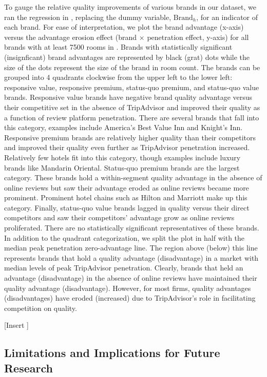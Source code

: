 \documentclass[mksc,blindrev]{informs3} %
\begin{document}
To gauge the relative quality improvements of various brands in our dataset, we ran the regression in , replacing the dummy variable, $\text{Brand}_h$, for an indicator of each brand. For ease of interpretation, we plot the brand advantage (x-axis) versus the advantage erosion effect (brand $\times$ penetration effect, y-axis) for all brands with at least 7500 rooms in . Brands with statistically significant (insignficant) brand advantages are represented by black (grat) dots while the size of the dots represent the size of the brand in room count. The brands can be grouped into 4 quadrants clockwise from the upper left to the lower left: responsive value, responsive premium, status-quo premium, and status-quo value brands. Responsive value brands have negative brand quality advantage versus their competitive set in the absence of TripAdvisor and improved their quality as a function of review platform penetration. There are several brands that fall into this category, examples include America's Best Value Inn and Knight's Inn. Responsive premium brands are relatively higher quality than their competitors and improved their quality even further as TripAdvisor penetration increased. Relatively few hotels fit into this category, though examples include luxury brands like Mandarin Oriental. Status-quo premium brands are the largest category. These brands hold a within-segment quality advantage in the absence of online reviews but saw their advantage eroded as online reviews became more prominent. Prominent hotel chains such as Hilton and Marriott make up this category. Finally, status-quo value brands lagged in quality versus their direct competitors and saw their competitors' advantage grow as online reviews proliferated. There are no statistically significant representatives of these brands. In addition to the quadrant categorization, we split the plot in half with the median peak penetration zero-advantage line. The region above (below) this line represents brands that hold a quality advantage (disadvantage) in a market with median levels of peak TripAdvisor penetration. Clearly, brands that held an advantage (disadvantage) in the absence of online reviews have maintained their quality advantage (disadvantage). However, for most firms, quality advantages (disadvantages) have eroded (increased) due to TripAdvisor's role in facilitating competition on quality. 

[Insert ]

\subsection{Limitations and Implications for Future Research}
\end{document}
